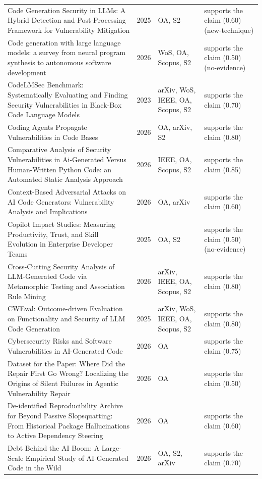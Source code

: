 \begin{longtable}{@{}%
  >{\raggedright\arraybackslash}p{}c%
  >{\raggedright\arraybackslash}p{}%
  >{\raggedright\arraybackslash}p{}@{}}
Code Generation Security in LLMs: A Hybrid Detection and Post-Processing Framework for Vulnerability Mitigation & 2025 & OA, S2 & supports the claim (0.60) (new-technique) \\
Code generation with large language models: a survey from neural program synthesis to autonomous software development & 2026 & WoS, OA, Scopus, S2 & supports the claim (0.50) (no-evidence) \\
CodeLMSec Benchmark: Systematically Evaluating and Finding Security Vulnerabilities in Black-Box Code Language Models & 2023 & arXiv, WoS, IEEE, OA, Scopus, S2 & supports the claim (0.70) \\
Coding Agents Propagate Vulnerabilities in Code Bases & 2026 & OA, arXiv, S2 & supports the claim (0.80) \\
Comparative Analysis of Security Vulnerabilities in Ai-Generated Versus Human-Written Python Code: an Automated Static Analysis Approach & 2026 & IEEE, OA, Scopus, S2 & supports the claim (0.85) \\
Context-Based Adversarial Attacks on AI Code Generators: Vulnerability Analysis and Implications & 2026 & OA, arXiv & supports the claim (0.60) \\
Copilot Impact Studies: Measuring Productivity, Trust, and Skill Evolution in Enterprise Developer Teams & 2025 & OA, S2 & supports the claim (0.50) (no-evidence) \\
Cross-Cutting Security Analysis of LLM-Generated Code via Metamorphic Testing and Association Rule Mining & 2026 & arXiv, IEEE, OA, Scopus, S2 & supports the claim (0.80) \\
CWEval: Outcome-driven Evaluation on Functionality and Security of LLM Code Generation & 2025 & arXiv, WoS, IEEE, OA, Scopus, S2 & supports the claim (0.80) \\
Cybersecurity Risks and Software Vulnerabilities in AI-Generated Code & 2026 & OA & supports the claim (0.75) \\
Dataset for the Paper: Where Did the Repair First Go Wrong? Localizing the Origins of Silent Failures in Agentic Vulnerability Repair & 2026 & OA & supports the claim (0.50) \\
De-identified Reproducibility Archive for Beyond Passive Slopsquatting: From Historical Package Hallucinations to Active Dependency Steering & 2026 & OA & supports the claim (0.60) \\
Debt Behind the AI Boom: A Large-Scale Empirical Study of AI-Generated Code in the Wild & 2026 & OA, S2, arXiv & supports the claim (0.70) \\

\end{longtable}
